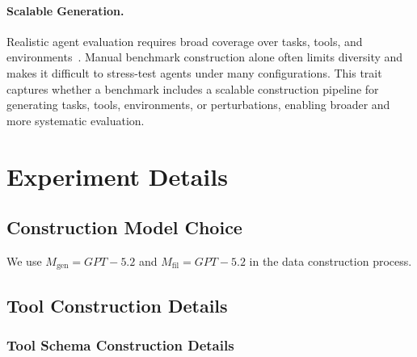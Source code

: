 \documentclass{llmxive}
\begin{document}

\paragraph{Scalable Generation.}
Realistic agent evaluation requires broad coverage over tasks, tools, and environments~\citep{RandomWorld, ToolLLM, LiveAPIBench,guo2025mathematical}. 
Manual benchmark construction alone often limits diversity and makes it difficult to stress-test agents under many configurations. 
This trait captures whether a benchmark includes a scalable construction pipeline for generating tasks, tools, environments, or perturbations, enabling broader and more systematic evaluation.




\section{Experiment Details}
\label{app:experiment-details}

\subsection{Construction Model Choice}
\label{app:model-choice}

We use $M_{\mathrm{gen}}=GPT-5.2$ and $M_{\mathrm{fil}}=GPT-5.2$ in the data construction process.

\subsection{Tool Construction Details}
\label{app:tool-construction-details}

\subsubsection{Tool Schema Construction Details}
\label{app:schema-construction-details}
\end{document}
